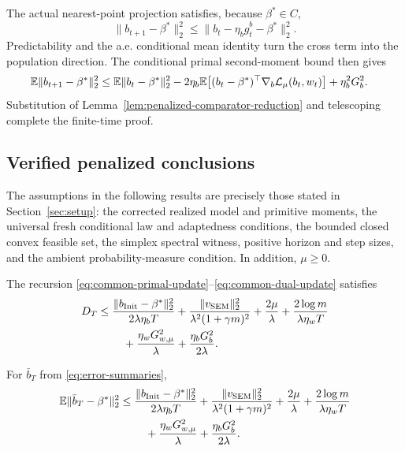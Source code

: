The actual nearest-point projection satisfies, because $\beta^*\in C$,
\[
  \|b_{t+1}-\beta^*\|_2^2
  \le\|b_t-\eta_b\widehat g_t^b-\beta^*\|_2^2.
\]
Predictability and the a.e. conditional mean identity turn the cross term into
the population direction.  The conditional primal second-moment bound then
gives
\begin{align*}
  \mathbb{E}\|b_{t+1}-\beta^*\|_2^2
  \le{}&\mathbb{E}\|b_t-\beta^*\|_2^2
  -2\eta_b\mathbb{E}\!\left[
    (b_t-\beta^*)^\top\nabla_b\mathcal L_\mu(b_t,w_t)
  \right]
  +\eta_b^2G_b^2.
\end{align*}
Substitution of Lemma~\ref{lem:penalized-comparator-reduction} and telescoping
complete the finite-time proof.

\subsection{Verified penalized conclusions}

The assumptions in the following results are precisely those stated in
Section~\ref{sec:setup}: the corrected realized model and primitive moments,
the universal fresh conditional law and adaptedness conditions, the bounded
closed convex feasible set, the simplex spectral witness, positive horizon and
step sizes, and the ambient probability-measure condition.  In addition,
$\mu\ge0$.

\begin{theorem}
\label{thm:penalized-fixed-comparator}
The recursion \eqref{eq:common-primal-update}--\eqref{eq:common-dual-update}
satisfies
\begin{align}
  D_T\le{}&
  \frac{\|b_{\rm Init}-\beta^*\|_2^2}
       {2\lambda\eta_bT}
  +\frac{\|v_{\rm SEM}\|_2^2}
       {\lambda^2(1+\gamma m)^2}
  +\frac{2\mu}{\lambda}
  +\frac{2\log m}{\lambda\eta_wT}
  \notag\\
  &\quad
  +\frac{\eta_wG_{w,\mu}^2}{\lambda}
  +\frac{\eta_bG_b^2}{2\lambda}.
  \label{eq:penalized-average-bound}
\end{align}
\end{theorem}

\begin{theorem}
\label{thm:penalized-averaged-iterate}
For $\bar b_T$ from \eqref{eq:error-summaries},
\begin{align}
  \mathbb{E}\|\bar b_T-\beta^*\|_2^2\le{}&
  \frac{\|b_{\rm Init}-\beta^*\|_2^2}
       {2\lambda\eta_bT}
  +\frac{\|v_{\rm SEM}\|_2^2}
       {\lambda^2(1+\gamma m)^2}
  +\frac{2\mu}{\lambda}
  +\frac{2\log m}{\lambda\eta_wT}
  \notag\\
  &\quad
  +\frac{\eta_wG_{w,\mu}^2}{\lambda}
  +\frac{\eta_bG_b^2}{2\lambda}.
  \label{eq:penalized-averaged-iterate-bound}
\end{align}
\end{theorem}

